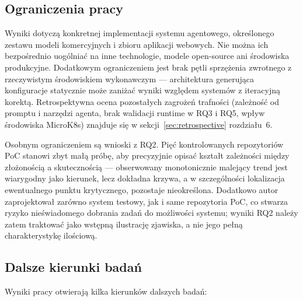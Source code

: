 \subsection{Ograniczenia pracy}
\label{sec:ograniczenia}

Wyniki dotyczą konkretnej implementacji systemu agentowego, określonego zestawu modeli komercyjnych i zbioru aplikacji webowych. Nie można ich bezpośrednio uogólniać na inne technologie, modele open-source ani środowiska produkcyjne. Dodatkowym ograniczeniem jest brak pętli sprzężenia zwrotnego z rzeczywistym środowiskiem wykonawczym — architektura generująca konfiguracje statycznie może zaniżać wyniki względem systemów z iteracyjną korektą. Retrospektywna ocena pozostałych zagrożeń trafności (zależność od promptu i narzędzi agenta, brak walidacji runtime w RQ3 i RQ5, wpływ środowiska MicroK8s) znajduje się w sekcji~\ref{sec:retrospective} rozdziału~6.

Osobnym ograniczeniem są wnioski z RQ2. Pięć kontrolowanych repozytoriów PoC stanowi zbyt małą próbę, aby precyzyjnie opisać kształt zależności między złożonością a skutecznością — obserwowany monotonicznie malejący trend jest wiarygodny jako kierunek, lecz dokładna krzywa, a w szczególności lokalizacja ewentualnego punktu krytycznego, pozostaje nieokreślona. Dodatkowo autor zaprojektował zarówno system testowy, jak i same repozytoria PoC, co stwarza ryzyko nieświadomego dobrania zadań do możliwości systemu; wyniki RQ2 należy zatem traktować jako wstępną ilustrację zjawiska, a nie jego pełną charakterystykę ilościową.

\subsection{Dalsze kierunki badań}

Wyniki pracy otwierają kilka kierunków dalszych badań:

